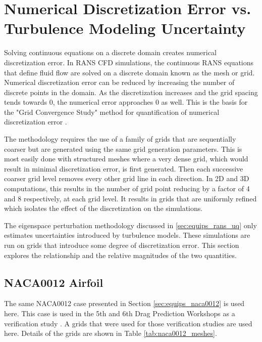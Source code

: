 \section{Numerical Discretization Error vs. Turbulence Modeling Uncertainty}\label{sec:num_vs_turb_error}

Solving continuous equations on a discrete domain creates numerical discretization error.
In RANS CFD simulations, the continuous RANS equations that define fluid flow are solved on a discrete domain known as the mesh or grid.
Numerical discretization error can be reduced by increasing the number of discrete points in the domain.
As the discretization increases and the grid spacing tends towards $0$, the numerical error approaches $0$ as well. 
This is the basis for the "Grid Convergence Study" method for quantification of numerical discretization error \cite{american_society_of_mechanical_engineers_standard_2009}.

The methodology requires the use of a family of grids that are sequentially coarser but are generated using the same grid generation parameters.
This is most easily done with structured meshes where a very dense grid, which would result in minimal discretization error, is first generated.
Then each successive coarser grid level removes every other grid line in each direction.
In 2D and 3D computations, this results in the number of grid point reducing by a factor of 4 and 8 respectively, at each grid level.
It results in grids that are uniformly refined which isolates the effect of the discretization on the simulations. 

The eigenspace perturbation methodology discussed in \ref{sec:equips_rans_uq} only estimates uncertainties introduced by turbulence models.
These simulations are run on grids that introduce some degree of discretization error.
This section explores the relationship and the relative magnitudes of the two quantities.

\subsection{NACA0012 Airfoil} \label{sec:num_err_naca0012}

The same NACA0012 case presented in Section \ref{sec:equips_naca0012} is used here. 
This case is used in the 5th and 6th Drag Prediction Workshops as a verification study \cite{levy2013summary,roy2017summary}.
A grids that were used for those verification studies are used here. 
Details of the grids are shown in Table \ref{tab:naca0012_meshes}.

